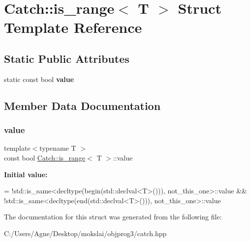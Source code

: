 \hypertarget{struct_catch_1_1is__range}{}\section{Catch\+:\+:is\+\_\+range$<$ T $>$ Struct Template Reference}
\label{struct_catch_1_1is__range}
\subsection*{Static Public Attributes}
\begin{DoxyCompactItemize}
\item 
static const bool {\bfseries value}
\end{DoxyCompactItemize}


\subsection{Member Data Documentation}
\mbox{\label{struct_catch_1_1is__range_afaec39e819c3956829cbbd00feba11be}} 
\subsubsection{\texorpdfstring{value}{value}}
{\footnotesize\ttfamily template$<$typename T $>$ \\
const bool \mbox{\hyperlink{struct_catch_1_1is__range}{Catch\+::is\+\_\+range}}$<$ T $>$\+::value\hspace{0.3cm}{\ttfamily [static]}}

{\bfseries Initial value\+:}
\begin{DoxyCode}
=
            !std::is\_same<decltype(begin(std::declval<T>())), not\_this\_one>::value &&
            !std::is\_same<decltype(end(std::declval<T>())), not\_this\_one>::value
\end{DoxyCode}


The documentation for this struct was generated from the following file\+:\begin{DoxyCompactItemize}
\item 
C\+:/\+Users/\+Agne/\+Desktop/mokslai/objprog3/catch.\+hpp\end{DoxyCompactItemize}
